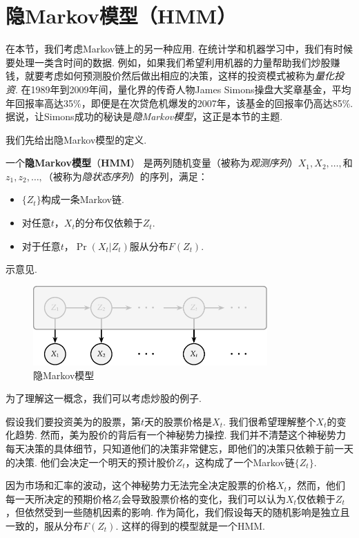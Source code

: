 \section{隐Markov模型（HMM）}\label{sec:HMM}

在本节，我们考虑Markov链上的另一种应用. 在统计学和机器学习中，我们有时候要处理一类含时间的数据. 例如，如果我们希望利用机器的力量帮助我们炒股赚钱，就要考虑如何预测股价然后做出相应的决策，这样的投资模式被称为\textit{量化投资}. 在1989年到2009年间，量化界的传奇人物James Simons操盘大奖章基金，平均年回报率高达35\%，即便是在次贷危机爆发的2007年，该基金的回报率仍高达85\%. 据说，让Simons成功的秘诀是\textit{隐Markov模型}，这正是本节的主题.

我们先给出隐Markov模型的定义. 

\begin{definition}
一个\textbf{隐Markov模型}（\textbf{HMM}） 是两列随机变量（被称为\textit{观测序列}）$X_1,X_2,\dots,$和$z_1,z_2,\dots,$（被称为\textit{隐状态序列}）的序列，满足：
    \begin{itemize}
        \item $\{Z_t\}$构成一条Markov链.
        \item 对任意$t$，$X_t$的分布仅依赖于$Z_t$.
        \item 对于任意$t$，$\Pr(X_t|Z_t)$服从分布$F(Z_t)$.
    \end{itemize}
\end{definition}
示意见.
\begin{figure}[ht]
    \centering
    \includegraphics[width=0.8\textwidth]{figures/Markov-chain/HMM.pdf}
    \caption{隐Markov模型}
    \label{fig:HMM}
\end{figure}    

为了理解这一概念，我们可以考虑炒股的例子. 
\begin{example}[美为HMM]\label{ex:meiwei-HMM}
假设我们要投资美为的股票，第$t$天的股票价格是$X_t$. 我们很希望理解整个$X_t$的变化趋势. 然而，美为股价的背后有一个神秘势力操控. 我们并不清楚这个神秘势力每天决策的具体细节，只知道他们的决策非常健忘，即他们的决策只依赖于前一天的决策. 他们会决定一个明天的预计股价$Z_t$，这构成了一个Markov链$\{Z_t\}$. 

因为市场和汇率的波动，这个神秘势力无法完全决定股票的价格$X_t$，然而，他们每一天所决定的预期价格$Z_t$会导致股票价格的变化，我们可以认为$X_t$仅依赖于$Z_t$，但依然受到一些随机因素的影响. 作为简化，我们假设每天的随机影响是独立且一致的，服从分布$F(Z_t)$. 这样的得到的模型就是一个HMM.
\end{example}

